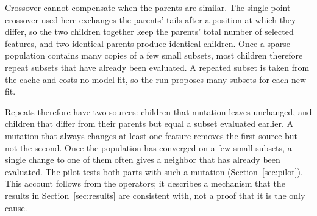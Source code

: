 Crossover cannot compensate when the parents are similar. The single-point crossover used here exchanges the parents' tails after a position at which they differ, so the two children together keep the parents' total number of selected features, and two identical parents produce identical children. Once a sparse population contains many copies of a few small subsets, most children therefore repeat subsets that have already been evaluated. A repeated subset is taken from the cache and costs no model fit, so the run proposes many subsets for each new fit.

Repeats therefore have two sources: children that mutation leaves unchanged, and children that differ from their parents but equal a subset evaluated earlier. A mutation that always changes at least one feature removes the first source but not the second. Once the population has converged on a few small subsets, a single change to one of them often gives a neighbor that has already been evaluated. The pilot tests both parts with such a mutation (Section~\ref{sec:pilot}). This account follows from the operators; it describes a mechanism that the results in Section~\ref{sec:results} are consistent with, not a proof that it is the only cause.
